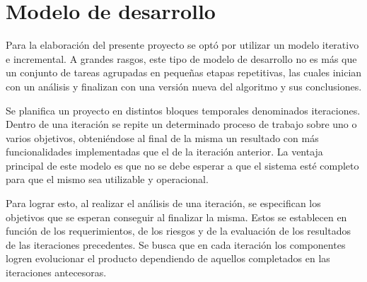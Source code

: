 \section{Modelo de desarrollo}
Para la elaboración del presente proyecto se optó por utilizar un modelo iterativo e incremental. A grandes rasgos, este tipo de modelo de desarrollo no es más que un conjunto de tareas agrupadas en pequeñas etapas repetitivas, las cuales inician con un análisis y finalizan con una versión nueva del algoritmo y sus conclusiones. \\

\par Se planifica un proyecto en distintos bloques temporales denominados iteraciones. Dentro de una iteración se repite un determinado proceso de trabajo sobre uno o varios objetivos, obteniéndose al final de la misma un resultado con más funcionalidades implementadas que el de la iteración anterior. La ventaja principal de este modelo es que no se debe esperar a que el sistema esté completo para que el mismo sea utilizable y operacional. \\

\par Para lograr esto, al realizar el análisis de una iteración, se especifican los objetivos que se esperan conseguir al finalizar la misma. Estos se establecen en función de los requerimientos, de los riesgos y de la evaluación de los resultados de las iteraciones precedentes. Se busca que en cada iteración los componentes logren evolucionar el producto dependiendo de aquellos completados en las iteraciones antecesoras. \\

